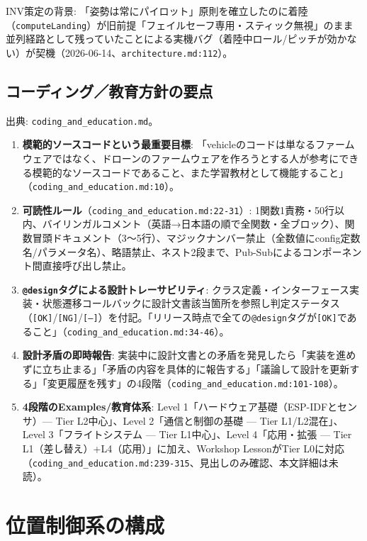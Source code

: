 \documentclass[a4paper,10pt]{ltjsarticle}
\begin{document}
INV策定の背景: 「姿勢は常にパイロット」原則を確立したのに着陸（\texttt{computeLanding}）が旧前提「フェイルセーフ専用・スティック無視」のまま並列経路として残っていたことによる実機バグ（着陸中ロール/ピッチが効かない）が契機（2026-06-14、\texttt{architecture.md:112}）。

\subsection{コーディング／教育方針の要点}

出典: \texttt{coding\_and\_education.md}。

\begin{enumerate}[leftmargin=*]
  \item \textbf{模範的ソースコードという最重要目標}: 「vehicleのコードは単なるファームウェアではなく、ドローンのファームウェアを作ろうとする人が参考にできる模範的なソースコードであること、また学習教材として機能すること」（\texttt{coding\_and\_education.md:10}）。
  \item \textbf{可読性ルール}（\texttt{coding\_and\_education.md:22-31}）: 1関数1責務・50行以内、バイリンガルコメント（英語→日本語の順で全関数・全ブロック）、関数冒頭ドキュメント（3〜5行）、マジックナンバー禁止（全数値にconfig定数名/パラメータ名）、略語禁止、ネスト2段まで、Pub-Subによるコンポーネント間直接呼び出し禁止。
  \item \textbf{\texttt{@design}タグによる設計トレーサビリティ}: クラス定義・インターフェース実装・状態遷移コールバックに設計文書該当箇所を参照し判定ステータス（\texttt{[OK]}/\texttt{[NG]}/\texttt{[--]}）を付記。「リリース時点で全ての\texttt{@design}タグが\texttt{[OK]}であること」（\texttt{coding\_and\_education.md:34-46}）。
  \item \textbf{設計矛盾の即時報告}: 実装中に設計文書との矛盾を発見したら「実装を進めずに立ち止まる」「矛盾の内容を具体的に報告する」「議論して設計を更新する」「変更履歴を残す」の4段階（\texttt{coding\_and\_education.md:101-108}）。
  \item \textbf{4段階のExamples/教育体系}: Level 1「ハードウェア基礎（ESP-IDFとセンサ）— Tier L2中心」、Level 2「通信と制御の基礎 — Tier L1/L2混在」、Level 3「フライトシステム — Tier L1中心」、Level 4「応用・拡張 — Tier L1（差し替え）+L4（応用）」に加え、Workshop LessonがTier L0に対応（\texttt{coding\_and\_education.md:239-315}、見出しのみ確認、本文詳細は未読）。
\end{enumerate}

\section{位置制御系の構成}
\end{document}
